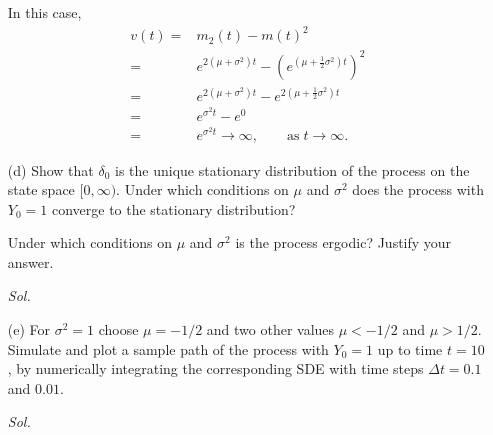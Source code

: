 \begin{enumerate}
        In this case,
        \begin{align*}
            v(t) = & m_2(t) - m(t)^2 \\ 
            = & e^{2(\mu + \sigma^2)t} - \left( e^{(\mu+ \frac{1}{2} \sigma^2) t} \right)^2 \\ 
            = & e^{2(\mu + \sigma^2)t} - e^{2( \mu + \frac{1}{2}\sigma^2)t} \\ 
            = & e^{\sigma^2 t} - e^{0} \\ 
            = & e^{\sigma^2 t} \to \infty, \qquad \text{as} \; t \to \infty.
        \end{align*}

    \item[(d)] Show that $\delta_0$ is the unique stationary distribution of the process on the state space $[0, \infty)$. Under which conditions on $\mu$ and $\sigma^2$ does the process with $Y_0 = 1$ converge to the stationary distribution?
    
    Under which conditions on $\mu$ and $\sigma^2$ is the process ergodic? Justify your answer.

        \textit{ Sol. } 

    \item[(e)] For $\sigma^2 = 1$ choose $\mu = -1/2$ and two other values $\mu < -1/2$ and $\mu > 1/2$. Simulate and plot a sample path of the process with $Y_0 = 1$ up to time $t = 10$, by numerically integrating the corresponding SDE with time steps $\Delta t = 0.1$ and $0.01$.
    
        \textit{ Sol. }

\end{enumerate}
